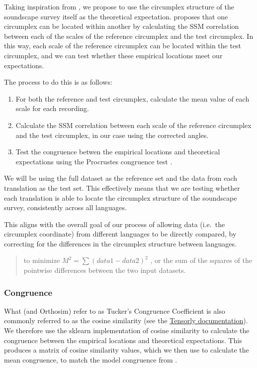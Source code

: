\documentclass[
  authoryear,
  preprint,
  3p]{elsarticle}
\providecommand{\tightlist}{%
  \setlength{\itemsep}{0pt}\setlength{\parskip}{0pt}}\usepackage{longtable,booktabs,array}
\begin{document}
Taking inspiration from \citet{Yik2004Relationship}, we propose to use
the circumplex structure of the soundscape survey itself as the
theoretical expectation. \citet{Yik2004Relationship} proposes that one
circumplex can be located within another by calculating the SSM
correlation between each of the scales of the reference circumplex and
the test circumplex. In this way, each scale of the reference circumplex
can be located within the test circumplex, and we can test whether these
empirical locations meet our expectations.

The process to do this is as follows:

\begin{enumerate}
\def\labelenumi{\arabic{enumi}.}
\tightlist
\item
  For both the reference and test circumplex, calculate the mean value
  of each scale for each recording.
\item
  Calculate the SSM correlation between each scale of the reference
  circumplex and the test circumplex, in our case using the corrected
  angles.
\item
  Test the congruence betwen the empirical locations and theoretical
  expectations using the Procrustes congruence test
  \citep{Rogoza2021three}.
\end{enumerate}

We will be using the full dataset as the reference set and the data from
each translation as the test set. This effectively means that we are
testing whether each translation is able to locate the circumplex
structure of the soundscape survey, consistently across all languages.

This aligns with the overall goal of our process of allowing data
(i.e.~the circumplex coordinate) from different languages to be directly
compared, by correcting for the differences in the circumplex structure
between languages.

\begin{quote}
to minimize \(M^2 = \sum (data1 - data2)^2\) , or the sum of the squares
of the pointwise differences between the two input datasets.
\end{quote}

\subsubsection{Congruence}\label{congruence}

What \citet{Rogoza2021three} (and Orthosim) refer to as Tucker's
Congruence Coefficient is also commonly referred to as the cosine
similarity (see the
\href{https://tensorly.org/stable/modules/generated/tensorly.metrics.factors.congruence_coefficient.html}{Tensorly
documentation}). We therefore use the sklearn implementation of cosine
similarity to calculate the congruence between the empirical locations
and theoretical expectations. This produces a matrix of cosine
similarity values, which we then use to calculate the mean congruence,
to match the model congruence from \citet{Rogoza2021three}.
\end{document}
